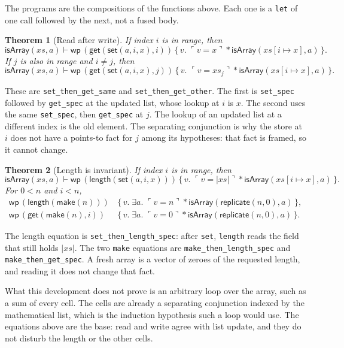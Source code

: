\documentclass[11pt]{article}
\newtheorem{theorem}{Theorem}
\newcommand{\sep}{\mathbin{*}}
\newcommand{\Wpre}{\mathsf{wp}}
\newcommand{\pure}[1]{\ulcorner #1 \urcorner}
\begin{document}
The programs are the compositions of the functions above.
Each one is a \texttt{let} of one call followed by the next, not a fused body.

\begin{theorem}[Read after write]
If index \(i\) is in range, then
\[
\mathsf{isArray}(xs, a)
\vdash
\Wpre\,(\mathsf{get}(\mathsf{set}(a, i, x), i))
\,\{\,v.\; \pure{v = x} \sep \mathsf{isArray}(xs[i \mapsto x], a)\,\}.
\]
If \(j\) is also in range and \(i \neq j\), then
\[
\mathsf{isArray}(xs, a)
\vdash
\Wpre\,(\mathsf{get}(\mathsf{set}(a, i, x), j))
\,\{\,v.\; \pure{v = xs_j} \sep \mathsf{isArray}(xs[i \mapsto x], a)\,\}.
\]
\end{theorem}

These are \texttt{set\_then\_get\_same} and \texttt{set\_then\_get\_other}.
The first is \texttt{set\_spec} followed by \texttt{get\_spec} at the updated list, whose lookup at \(i\) is \(x\).
The second uses the same \texttt{set\_spec}, then \texttt{get\_spec} at \(j\).
The lookup of an updated list at a different index is the old element.
The separating conjunction is why the store at \(i\) does not have a points-to fact for \(j\) among its hypotheses: that fact is framed, so it cannot change.

\begin{theorem}[Length is invariant]
If index \(i\) is in range, then
\[
\mathsf{isArray}(xs, a)
\vdash
\Wpre\,(\mathsf{length}(\mathsf{set}(a, i, x)))
\,\{\,v.\; \pure{v = \lvert xs \rvert} \sep \mathsf{isArray}(xs[i \mapsto x], a)\,\}.
\]
For \(0 < n\) and \(i < n\),
\[
\begin{aligned}
\Wpre\,(\mathsf{length}(\mathsf{make}(n)))
&\,\{\,v.\; \exists a.\; \pure{v = n} \sep \mathsf{isArray}(\mathsf{replicate}(n, 0), a)\,\},\\
\Wpre\,(\mathsf{get}(\mathsf{make}(n), i))
&\,\{\,v.\; \exists a.\; \pure{v = 0} \sep \mathsf{isArray}(\mathsf{replicate}(n, 0), a)\,\}.
\end{aligned}
\]
\end{theorem}

The length equation is \texttt{set\_then\_length\_spec}: after \texttt{set}, \texttt{length} reads the field that still holds \(\lvert xs \rvert\).
The two \texttt{make} equations are \texttt{make\_then\_length\_spec} and \texttt{make\_then\_get\_spec}.
A fresh array is a vector of zeroes of the requested length, and reading it does not change that fact.

What this development does not prove is an arbitrary loop over the array, such as a sum of every cell.
The cells are already a separating conjunction indexed by the mathematical list, which is the induction hypothesis such a loop would use.
The equations above are the base: read and write agree with list update, and they do not disturb the length or the other cells.
\end{document}
